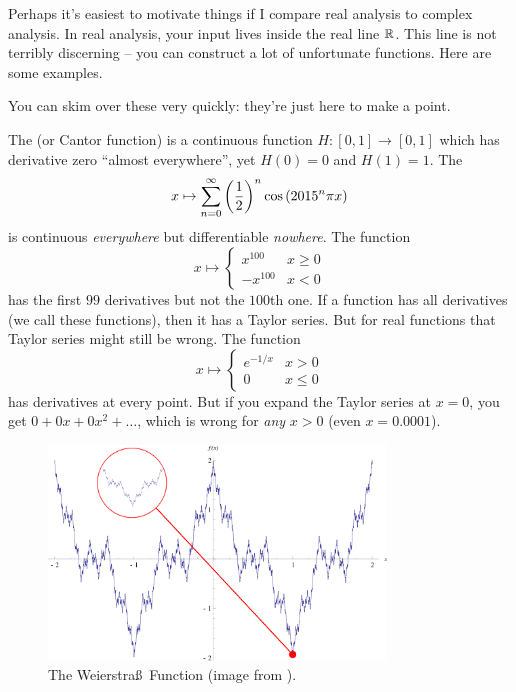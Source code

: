 Perhaps it's easiest to motivate things if I compare real analysis to complex analysis.
In real analysis, your input lives inside the real line $\mathbb R$.
This line is not terribly discerning -- you can construct a lot of unfortunate functions.
Here are some examples.
\begin{example}
	You can skim over these very quickly: they're just here to make a point.
	\begin{enumerate}[(a)]
		\ii The  (or Cantor function)
		is a continuous function $H : [0,1] \to [0,1]$
		which has derivative zero ``almost everywhere'',
		yet $H(0) = 0$ and $H(1) = 1$.
		\ii The 
		\[ x \mapsto \sum_{n=0}^\infty \left( \frac{1}{2} \right)^n \cos \left( 2015^n \pi x \right) \]
		is continuous \emph{everywhere} but differentiable \emph{nowhere}.
		\ii The function
		\[
			x \mapsto 
			\begin{cases}
				x^{100} & x \ge 0 \\
				-x^{100} & x < 0
			\end{cases}
		\]
		has the first $99$ derivatives but not the $100$th one.
		\ii
		If a function has all derivatives (we call these  functions),
		then it has a Taylor series.
		But for real functions that Taylor series might still be wrong. The function
		\[ x \mapsto
			\begin{cases}
				e^{-1/x} & x > 0 \\
				0 & x \le 0
			\end{cases}
		\]
		has derivatives at every point.
		But if you expand the Taylor series at $x=0$, you get $0 + 0x + 0x^2 + \dots$,
		which is wrong for \emph{any} $x > 0$ (even $x=0.0001$).
	\end{enumerate}
\end{example}
\begin{figure}[h]
	\centering
	\includegraphics[width=0.8\textwidth]{media/weierstrass-pubdomain.png}
	\caption{The Weierstra\ss\ Function (image from \cite{img:weierstrass}).}
\end{figure}

